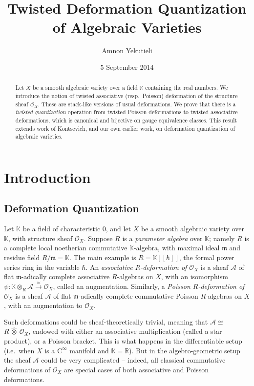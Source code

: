 \documentclass[a4paper, 10pt]{amsart}
\date{5 September 2014}
\title[Twisted Deformation Quantization]{Twisted Deformation
Quantization of Algebraic Varieties}
\author{Amnon Yekutieli}
\theoremstyle{definition}
\numberwithin{equation}{section}
\newcommand{\iso}{\xrightarrow{\simeq}}
\newcommand{\mfrak}[1]{\mathfrak{#1}}
\newcommand{\mcal}[1]{\mathcal{#1}}
\newcommand{\mrm}[1]{\mathrm{#1}}
\newcommand{\mbb}[1]{\mathbb{#1}}
\newcommand{\hatotimes}[1]{\, \what{{\otimes}}_{#1} \,}
\newcommand{\hot}{\hatotimes{}}
\newcommand{\what}[1]{\widehat{#1}}
\newcommand{\K}{\mbb{K}}
\newcommand{\R}{\mbb{R}}
\newcommand{\m}{\mfrak{m}}
\newcommand{\lb}{\linebreak}
\begin{document}
\begin{abstract}
Let $X$ be a smooth algebraic variety over a field $\K$ containing the real
numbers. We introduce the notion of twisted associative (resp.\
Poisson) deformation of the structure sheaf $\mcal{O}_X$. These are
stack-like versions of usual deformations. We prove that there is a
{\em twisted quantization} operation from twisted Poisson deformations
to twisted associative deformations, which is canonical and bijective
on gauge equivalence classes. This result extends work of Kontsevich, and our
own earlier work, on deformation quantization of algebraic varieties.
\end{abstract}

\maketitle

\tableofcontents


\setcounter{section}{-1}
\section{Introduction}
\label{sec:Int}

\subsection{Deformation Quantization}
Let $\K$ be a field of characteristic $0$, and let $X$ be a
smooth algebraic variety over $\K$, with structure sheaf
$\mcal{O}_X$. Suppose $R$ is a {\em parameter algebra} over $\K$;
namely $R$ is a complete local noetherian commutative 
$\K$-algebra, with maximal ideal $\m$ and residue field $R / \m = \K$. 
The main example is $R = \K[[\hbar]]$, the formal power series ring in the
variable $\hbar$. An {\em associative $R$-deformation of $\mcal{O}_X$} is a
sheaf $\mcal{A}$ of flat $\m$-adically complete associative $R$-algebras on $X$,
with an isomorphism 
$\psi : \K \otimes_R \mcal{A} \iso \mcal{O}_X$, called an
augmentation. Similarly, a {\em Poisson $R$-deformation of $\mcal{O}_X$} is a
sheaf $\mcal{A}$ of flat $\m$-adically complete commutative Poisson $R$-algebras
on $X$, with an augmentation to $\mcal{O}_X$. 

Such deformations could be sheaf-theoretically trivial, meaning that
$\mcal{A} \cong$ \lb $R \hot \mcal{O}_X$, endowed
with either an associative multiplication (called a star product), or
a Poisson bracket. This is what happens in the differentiable setup
(i.e.\ when $X$ is a $\mrm{C}^{\infty}$ manifold and $\K = \R$). But in the
algebro-geometric setup the sheaf $\mcal{A}$ could be very complicated
-- indeed, all classical commutative deformations of $\mcal{O}_X$ are
special cases of both associative and Poisson deformations. 
\end{document}
